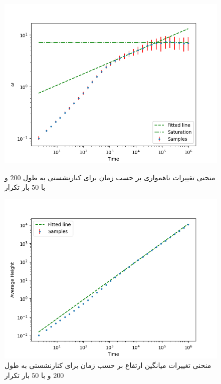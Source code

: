 \documentclass[11pt, a4paper]{article}
\begin{document}
\begin{figure}[h]
	\centering
  \begin{minipage}[b]{0.48\textwidth}
    \includegraphics[width=\textwidth]{q6_200_50_1_14_.4_omega.png}
    \caption{منحنی تغییرات ناهمواری بر حسب زمان برای کنارنشستی به طول $200$ و با $50$ بار تکرار}
    \label{fig:q6_200_50_omega}
  \end{minipage}
  \hfill
  \begin{minipage}[b]{0.48\textwidth}
    \includegraphics[width=\textwidth]{q6_200_50_1_14_.4_avg.png}
    \caption{منحنی تغییرات میانگین ارتفاع بر حسب زمان برای کنارنشستی به طول $200$ و با $50$ بار تکرار}
    \label{fig:q6_200_50_avg}
  \end{minipage}
\end{figure}
\end{document}
